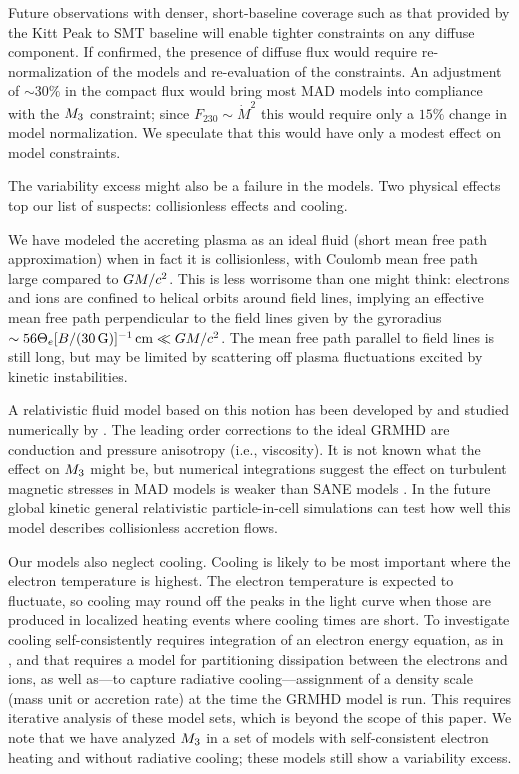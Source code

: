 Future observations with denser, short-baseline coverage such as that provided by the Kitt Peak to SMT baseline will enable tighter constraints on any diffuse component.  If confirmed, the presence of diffuse flux would require re-normalization of the models and re-evaluation of the constraints.  An adjustment of $\sim 30\%$ in the compact flux would bring most MAD models into compliance with the $M_{3}$ constraint; since $F_{230} \sim \dot{M}^2$ this would require only a $15\%$ change in model normalization.  We speculate that this would have only a modest effect on model constraints.

The variability excess might also be a failure in the models.  Two physical effects top our list of suspects: collisionless effects and cooling.

We have modeled the accreting plasma as an ideal fluid (short mean free path approximation) when in fact it is collisionless, with Coulomb mean free path large compared to $GM/c^2$.  This is less worrisome than one might think: electrons and ions are confined to helical orbits around field lines, implying an effective mean free path perpendicular to the field lines given by the gyroradius $\sim 56 \Theta_e [B/(30\,\mathrm{G})]^{-1} \,\mathrm{cm} \ll GM/c^2$.  The mean free path parallel to field lines is still long, but may be limited by scattering off plasma fluctuations excited by kinetic instabilities.

A relativistic fluid model based on this notion has been developed by \citet{2015ApJ...810..162C} and studied numerically by \citet{2017MNRAS.470.2240F}.  The leading order corrections to the ideal GRMHD are conduction and pressure anisotropy (i.e., viscosity).  It is not known what the effect on $M_{3}$ might be, but numerical integrations suggest the effect on turbulent magnetic stresses in MAD models is weaker than SANE models \citep{2017MNRAS.470.2240F}. In the future global kinetic general relativistic particle-in-cell simulations can test how well this model describes collisionless accretion flows.

Our models also neglect cooling.  Cooling is likely to be most important where the electron temperature is highest. The electron temperature is expected to fluctuate, so cooling may round off the peaks in the light curve when those are produced in localized heating events where cooling times are short.  To investigate cooling self-consistently requires integration of an electron energy equation, as in \cite{2015MNRAS.454.1848R}, and that requires a model for partitioning dissipation between the electrons and ions, as well as---to capture radiative cooling---assignment of a density scale (mass unit or accretion rate) at the time the GRMHD model is run.  This requires iterative analysis of these model sets, which is beyond the scope of this paper.  We note that we have analyzed $M_{3}$ in a set of models with self-consistent electron heating and without radiative cooling; these models still show a variability excess.

